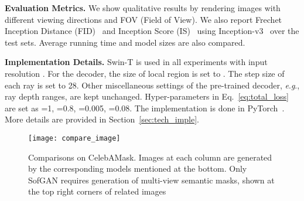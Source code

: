 \documentclass[runningheads]{llncs}
\newcommand{\eg}{\textit{e}.\textit{g}.}
\begin{document}
\noindent\textbf{Evaluation Metrics.}
We show qualitative results by rendering images with different viewing directions and FOV (Field of View). 
We also report Frechet Inception Distance (FID)~\cite{heusel2017gans} and Inception Score (IS)~\cite{salimans2016improved} using Inception-v3~\cite{szegedy2016rethinking} over the test sets. 
Average running time and model sizes are also compared.

\noindent\textbf{Implementation Details.} Swin-T is used in all experiments with input resolution . For the decoder, the size of local region  is set to . The step size of each ray is set to 28. Other miscellaneous settings of the pre-trained decoder, \eg, ray depth ranges, are kept unchanged. Hyper-parameters in Eq.~\eqref{eq:total_loss} are set as =1, =0.8, =0.005, =0.08. The implementation is done in PyTorch~\cite{paszke2019pytorch}. More details are provided in Section~\ref{sec:tech_imple}. 



\begin{figure}[t!]
    \centering
    \texttt{[image: compare\_image]} 
    \caption{Comparisons on CelebAMask. Images at each column are generated by the corresponding models mentioned at the bottom. Only SofGAN requires generation of multi-view semantic masks, shown at the top right corners of related images}
    \label{fig:compare_image}
\end{figure}
\end{document}
